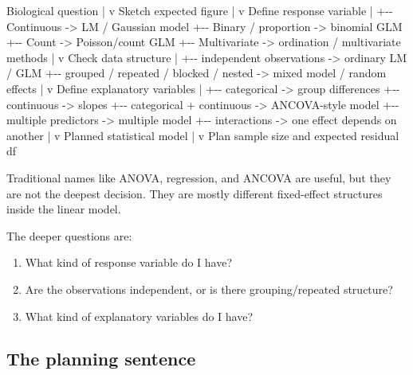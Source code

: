 \documentclass[
  letterpaper,
  8pt,
  a4paper]{book}
\newenvironment{Shaded}{\begin{snugshade}}{\end{snugshade}}
\newcommand{\NormalTok}[1]{\textcolor[rgb]{0.00,0.23,0.31}{#1}}
\providecommand{\tightlist}{%
  \setlength{\itemsep}{0pt}\setlength{\parskip}{0pt}}
\begin{document}
\begin{Shaded}
\begin{Highlighting}[]
\NormalTok{Biological question}
\NormalTok{        |}
\NormalTok{        v}
\NormalTok{Sketch expected figure}
\NormalTok{        |}
\NormalTok{        v}
\NormalTok{Define response variable}
\NormalTok{        |}
\NormalTok{        +{-}{-} Continuous {-}\textgreater{} LM / Gaussian model}
\NormalTok{        +{-}{-} Binary / proportion {-}\textgreater{} binomial GLM}
\NormalTok{        +{-}{-} Count {-}\textgreater{} Poisson/count GLM}
\NormalTok{        +{-}{-} Multivariate {-}\textgreater{} ordination / multivariate methods}
\NormalTok{        |}
\NormalTok{        v}
\NormalTok{Check data structure}
\NormalTok{        |}
\NormalTok{        +{-}{-} independent observations {-}\textgreater{} ordinary LM / GLM}
\NormalTok{        +{-}{-} grouped / repeated / blocked / nested {-}\textgreater{} mixed model / random effects}
\NormalTok{        |}
\NormalTok{        v}
\NormalTok{Define explanatory variables}
\NormalTok{        |}
\NormalTok{        +{-}{-} categorical {-}\textgreater{} group differences}
\NormalTok{        +{-}{-} continuous {-}\textgreater{} slopes}
\NormalTok{        +{-}{-} categorical + continuous {-}\textgreater{} ANCOVA{-}style model}
\NormalTok{        +{-}{-} multiple predictors {-}\textgreater{} multiple model}
\NormalTok{        +{-}{-} interactions {-}\textgreater{} one effect depends on another}
\NormalTok{        |}
\NormalTok{        v}
\NormalTok{Planned statistical model}
\NormalTok{        |}
\NormalTok{        v}
\NormalTok{Plan sample size and expected residual df}
\end{Highlighting}
\end{Shaded}

Traditional names like ANOVA, regression, and ANCOVA are useful, but
they are not the deepest decision. They are mostly different
fixed-effect structures inside the linear model.

The deeper questions are:

\begin{enumerate}
\def\labelenumi{\arabic{enumi}.}
\tightlist
\item
  What kind of response variable do I have?
\item
  Are the observations independent, or is there grouping/repeated
  structure?
\item
  What kind of explanatory variables do I have?
\end{enumerate}

\subsection*{The planning sentence}\label{the-planning-sentence}
\end{document}
